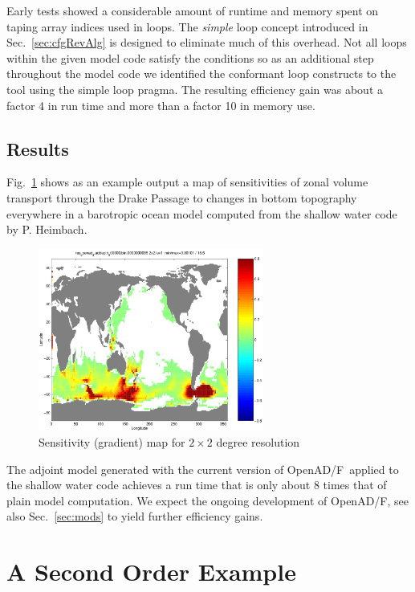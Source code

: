 \documentclass{book}
\newcommand{\OpenADF}{OpenAD/F}
\newcommand{\refsec}[1]{{Sec.~\ref{#1}}}
\newcommand{\reffig}[1]{{Fig.~\ref{#1}}}
\begin{document}
Early tests showed a considerable amount of runtime and memory 
spent on taping array indices used in loops. 
The {\em simple} loop concept introduced in \refsec{sec:cfgRevAlg}
is designed to eliminate much of this overhead. 
Not all loops within the given model code satisfy the conditions 
so as an additional step throughout the model code 
we identified the conformant loop constructs to 
the tool using the simple loop pragma. The resulting efficiency gain
was about a factor 4 in run time and more than a factor 10 in memory 
use.

\subsection{Results}
\reffig{fig:sensMap} shows as an example output a map of sensitivities of 
zonal volume transport through the Drake Passage 
to changes in bottom topography everywhere in a barotropic ocean model 
computed from the shallow water code by P. Heimbach.
\begin{figure}
\begin{center}
\includegraphics[height=6cm]{sensMap}
\end{center}
\caption{Sensitivity (gradient) map for $2\times 2$ degree resolution}\label{fig:sensMap}
\end{figure} 
The adjoint model generated with the current version of \OpenADF\ applied to the 
shallow water code achieves 
a run time that is only about 8 times that of  plain model computation.
We expect the ongoing development of \OpenADF, see also \refsec{sec:mods} to yield 
further efficiency gains.

\section{A Second Order Example}
\end{document}
